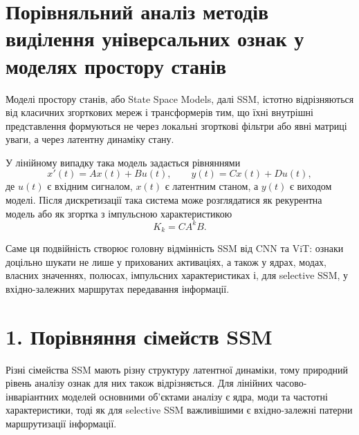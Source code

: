 \documentclass[12pt,a4paper]{article}
\begin{document}
\section*{Порівняльний аналіз методів виділення універсальних ознак
у моделях простору станів}

Моделі простору станів, або State Space Models, далі SSM, істотно
відрізняються від класичних згорткових мереж і трансформерів тим, що
їхні внутрішні представлення формуються не через локальні згорткові
фільтри або явні матриці уваги, а через латентну динаміку стану.

У лінійному випадку така модель задається рівняннями
\[
    x'(t)=Ax(t)+Bu(t), \qquad y(t)=Cx(t)+Du(t),
\]
де \(u(t)\) є вхідним сигналом, \(x(t)\) є латентним станом, а
\(y(t)\) є виходом моделі. Після дискретизації така система може
розглядатися як рекурентна модель або як згортка з імпульсною
характеристикою
\[
    K_k = C A^k B.
\]

Саме ця подвійність створює головну відмінність SSM від CNN та ViT:
ознаки доцільно шукати не лише у прихованих активаціях, а також у
ядрах, модах, власних значеннях, полюсах, імпульсних характеристиках
і, для selective SSM, у вхідно-залежних маршрутах передавання
інформації.

\section*{1. Порівняння сімейств SSM}

Різні сімейства SSM мають різну структуру латентної динаміки, тому
природний рівень аналізу ознак для них також відрізняється. Для
лінійних часово-інваріантних моделей основними об'єктами аналізу є
ядра, моди та частотні характеристики, тоді як для selective SSM
важливішими є вхідно-залежні патерни маршрутизації інформації.
\end{document}
